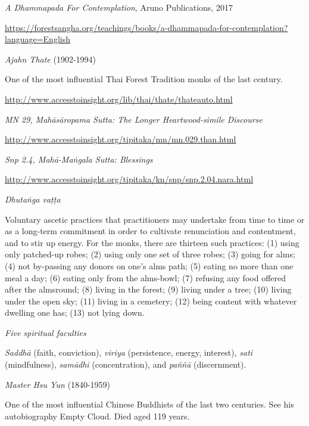 \begin{thebibliography}{9}

 \emph{A Dhammapada For Contemplation}, Aruno Publications, 2017

  {\urlsize \url{https://forestsangha.org/teachings/books/a-dhammapada-for-contemplation?language=English}}

 \emph{Ajahn Thate} (1902-1994)

  One of the most influential Thai Forest Tradition monks of the last century.

  {\urlsize \url{http://www.accesstoinsight.org/lib/thai/thate/thateauto.html}}

 \emph{MN 29, Mahāsāropama Sutta: The Longer Heartwood-simile Discourse}

  {\urlsize \url{http://www.accesstoinsight.org/tipitaka/mn/mn.029.than.html}}

 \emph{Snp 2.4, Mahā-Maṅgala Sutta: Blessings}

  {\urlsize \url{http://www.accesstoinsight.org/tipitaka/kn/snp/snp.2.04.nara.html}}

 \emph{Dhutaṅga vaṭṭa}

  Voluntary ascetic practices that practitioners may undertake from time to time
  or as a long-term commitment in order to cultivate renunciation and
  contentment, and to stir up energy. For the monks, there are thirteen such
  practices: (1) using only patched-up robes; (2) using only one set of three
  robes; (3) going for alms; (4) not by-passing any donors on one’s alms path;
  (5) eating no more than one meal a day; (6) eating only from the alms-bowl;
  (7) refusing any food offered after the almsround; (8) living in the forest;
  (9) living under a tree; (10) living under the open sky; (11) living in a
  cemetery; (12) being content with whatever dwelling one has; (13) not lying
  down.

 \emph{Five spiritual faculties}

  \emph{Saddhā} (faith, conviction), \emph{viriya} (persistence, energy,
  interest), \emph{sati} (mindfulness), \emph{samādhi} (concentration), and
  \emph{paññā} (discernment).

 \emph{Master Hsu Yun} (1840-1959)

  One of the most influential Chinese Buddhists of the last two centuries. See
  his autobiography Empty Cloud. Died aged 119 years.


\end{thebibliography}
